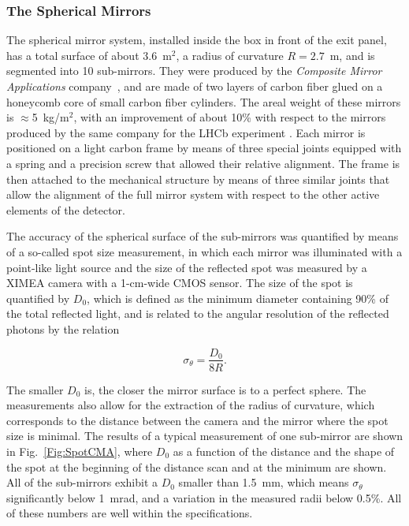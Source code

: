 \documentclass[5p,times,twocolumn]{elsarticle}
\begin{document}
\subsubsection{The Spherical Mirrors}

The spherical mirror system, installed inside the box in front of the exit panel, has a total surface of about 3.6~m$^2$,
a radius of curvature $R= 2.7$~m, and is segmented into 10 sub-mirrors. They were produced by the {\it Composite
Mirror Applications} company~\cite{REF:CMA}, and are made of two layers of carbon fiber glued on a honeycomb
core of small carbon fiber cylinders. The areal weight of these mirrors is $\approx$5~kg/m$^2$, with an
improvement of about 10\% with respect to the mirrors produced by the same company for the LHCb experiment
\cite{REF:LHCbMirrors}. Each mirror is positioned on a light carbon frame by means of three special joints equipped
with a spring and a precision screw that allowed their relative alignment. The frame is then attached to the mechanical
structure by means of three similar joints that allow the alignment of the full mirror system with respect to the other
active elements of the detector.

The accuracy of the spherical surface of the sub-mirrors was quantified by means of a so-called spot size
measurement, in which each mirror was illuminated with a point-like light source and the size of the reflected spot
was measured by a XIMEA camera with a 1-cm-wide CMOS sensor. The size of the spot is quantified by $D_0$, which
is defined as the minimum diameter containing 90\% of the total reflected light, and is related to the angular resolution
of the reflected photons by the relation

\begin{equation}
  \sigma_{\theta} = \frac{D_0}{8 R}.
\end{equation}

The smaller $D_0$ is, the closer the mirror surface is to a perfect sphere. The measurements also allow for the
extraction of the radius of curvature, which corresponds to the distance between the camera and the mirror where
the spot size is minimal. The results of a typical measurement of one sub-mirror are shown in Fig.~\ref{Fig:SpotCMA},
where $D_0$ as a function of the distance and the shape of the spot at the beginning of the distance scan and
at the minimum are shown. All of the sub-mirrors exhibit a $D_0$ smaller than 1.5~mm, which means $\sigma_{\theta}$
significantly below 1~mrad, and a variation in the measured radii below 0.5\%. All of these numbers are well within the
specifications.
\end{document}
